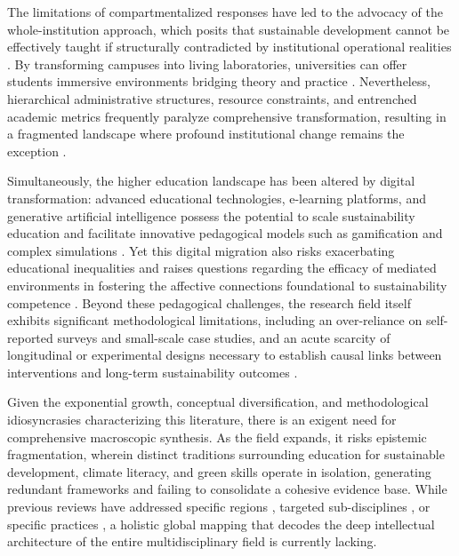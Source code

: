 \documentclass[pdflatex,sn-basic]{sn-jnl}%
\begin{document}
The limitations of compartmentalized responses have led to the advocacy of the whole-institution approach, which posits that sustainable development cannot be effectively taught if structurally contradicted by institutional operational realities \cite{keryan_unescos_2020, schopp_whole-institution_2020}. By transforming campuses into living laboratories, universities can offer students immersive environments bridging theory and practice \cite{oe_qualitative_2022, al-nuaimi_sustainable_2022}. Nevertheless, hierarchical administrative structures, resource constraints, and entrenched academic metrics frequently paralyze comprehensive transformation, resulting in a fragmented landscape where profound institutional change remains the exception \cite{alsharif_designing_2020, ruiz-mallen_what_2020, fischer_getting_2015, nogueiro_quality_2023}.

Simultaneously, the higher education landscape has been altered by digital transformation: advanced educational technologies, e-learning platforms, and generative artificial intelligence possess the potential to scale sustainability education and facilitate innovative pedagogical models such as gamification and complex simulations \cite{ferk_savec_role_2025, jarillo_challenges_2019}. Yet this digital migration also risks exacerbating educational inequalities and raises questions regarding the efficacy of mediated environments in fostering the affective connections foundational to sustainability competence \cite{okulich-kazarin_sustainability_2024, durrani_achieving_2023}. Beyond these pedagogical challenges, the research field itself exhibits significant methodological limitations, including an over-reliance on self-reported surveys and small-scale case studies, and an acute scarcity of longitudinal or experimental designs necessary to establish causal links between interventions and long-term sustainability outcomes \cite{dancz_utilizing_2017, probst_higher_2022}.

Given the exponential growth, conceptual diversification, and methodological idiosyncrasies characterizing this literature, there is an exigent need for comprehensive macroscopic synthesis. As the field expands, it risks epistemic fragmentation, wherein distinct traditions surrounding education for sustainable development, climate literacy, and green skills operate in isolation, generating redundant frameworks and failing to consolidate a cohesive evidence base. While previous reviews have addressed specific regions \cite{hallinger_evolution_2024}, targeted sub-disciplines \cite{narong_traversing_2024, nakad_systematic_2024}, or specific practices \cite{lim_systematic_2022}, a holistic global mapping that decodes the deep intellectual architecture of the entire multidisciplinary field is currently lacking.
\end{document}
